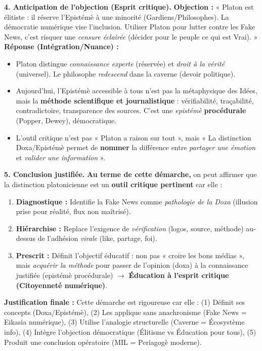 \documentclass[11pt]{article}
\newcommand{\cle}[1]{{\popxbold\color{popdark}#1}}
\begin{document}
\begin{exoresolu}
\textbf{4. Anticipation de l'objection (Esprit critique).}
\textbf{Objection :} « Platon est élitiste : il réserve l'Epistémè à une minorité (Gardiens/Philosophes). La démocratie numérique vise l'inclusion. Utiliser Platon pour lutter contre les Fake News, c'est risquer une \emph{censure éclairée} (décider pour le peuple ce qui est Vrai). »
\textbf{Réponse (Intégration/Nuance) :}
\begin{itemize}
    \item Platon distingue \emph{connaissance experte} (réservée) et \emph{droit à la vérité} (universel). Le philosophe \emph{redescend} dans la caverne (devoir politique).
    \item Aujourd'hui, l'\cle{Epistémè} accessible à tous n'est pas la métaphysique des Idées, mais la \textbf{méthode scientifique et journalistique} : vérifiabilité, traçabilité, contradictoire, transparence des sources. C'est une \emph{epistémè} \textbf{procédurale} (Popper, Dewey), démocratique.
    \item L'outil critique n'est pas « Platon a raison sur tout », mais « La distinction Doxa/Epistémè permet de \textbf{nommer} la différence entre \emph{partager une émotion} et \emph{valider une information} ».
\end{itemize}

\textbf{5. Conclusion justifiée.}
\textbf{Au terme de cette démarche,} on peut affirmer que la distinction platonicienne est un \textbf{outil critique pertinent} car elle :
\begin{enumerate}
    \item \textbf{Diagnostique :} Identifie la Fake News comme \emph{pathologie de la Doxa} (illusion prise pour réalité, flux non maîtrisé).
    \item \textbf{Hiérarchise :} Replace l'exigence de \emph{vérification} (logos, source, méthode) au-dessus de l'adhésion \emph{virale} (like, partage, foi).
    \item \textbf{Prescrit :} Définit l'objectif éducatif : non pas « croire les bons médias », mais \emph{acquérir la méthode} pour passer de l'opinion (doxa) à la connaissance justifiée (epistémè procédurale) $\rightarrow$ \textbf{Éducation à l'esprit critique (Citoyenneté numérique)}.
\end{enumerate}
\textbf{Justification finale :} Cette démarche est rigoureuse car elle : (1) Définit ses concepts (Doxa/Epistémè), (2) Les applique sans anachronisme (Fake News = Eikasia numérique), (3) Utilise l'analogie structurelle (Caverne = Écosystème info), (4) Intègre l'objection démocratique (Élitisme vs Éducation pour tous), (5) Produit une conclusion opératoire (MIL = Periagogè moderne).
\end{exoresolu}
\end{document}
